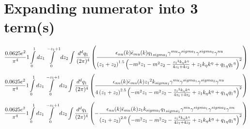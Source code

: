 \section*{Expanding numerator into 3 term(s)}
\begin{dmath}\frac{0.0625 e^{2}}{\pi^{4}}1\int\limits_{ 0 }^{ 1 } d{ z_{ 1 } }\int\limits_{ 0 }^{ - { z_{ 1 } } + 1 } d{ z_{ 2 } }\int\frac{d^d q_1 }{ (2\pi)^4 }\left(\frac{\epsilon_{ \\nu }({ k }) \bar{\epsilon}_{ \\mu }({ k }) { { q_1 }_{ \\sigma_1 } } { \gamma^{ \\mu } } { \gamma^{ \\sigma_1 } } { \gamma^{ \\sigma_2 } } { \gamma^{ \\nu } }}{\left({ z_{ 1 } } + { z_{ 2 } }\right)^{1.5} \left(- m^{2} { z_{ 1 } } - m^{2} { z_{ 2 } } - \frac{{ z_{ 1 } }^{2} { { k }_{ \eta } } { { k }^{ \eta } }}{4 { z_{ 1 } } + 4 { z_{ 2 } }} + { z_{ 1 } } { { k }_{ \eta } } { { k }^{ \eta } } + { { q_1 }_{ \eta } } { { q_1 }^{ \eta } }\right)^{2}}\right)\end{dmath}
\begin{dmath}\frac{0.0625 e^{2}}{\pi^{4}}1\int\limits_{ 0 }^{ 1 } d{ z_{ 1 } }\int\limits_{ 0 }^{ - { z_{ 1 } } + 1 } d{ z_{ 2 } }\int\frac{d^d q_1 }{ (2\pi)^4 }\left(\frac{\epsilon_{ \\nu }({ k }) \bar{\epsilon}_{ \\mu }({ k }) { z_{ 1 } }^{2} { { k }_{ \\sigma_1 } } { \gamma^{ \\mu } } { \gamma^{ \\sigma_1 } } { \gamma^{ \\sigma_2 } } { \gamma^{ \\nu } }}{4 \left({ z_{ 1 } } + { z_{ 2 } }\right)^{2.5} \left(- m^{2} { z_{ 1 } } - m^{2} { z_{ 2 } } - \frac{{ z_{ 1 } }^{2} { { k }_{ \eta } } { { k }^{ \eta } }}{4 { z_{ 1 } } + 4 { z_{ 2 } }} + { z_{ 1 } } { { k }_{ \eta } } { { k }^{ \eta } } + { { q_1 }_{ \eta } } { { q_1 }^{ \eta } }\right)^{2}}\right)\end{dmath}
\begin{dmath}\frac{0.0625 e^{2}}{\pi^{4}}1\int\limits_{ 0 }^{ 1 } d{ z_{ 1 } }\int\limits_{ 0 }^{ - { z_{ 1 } } + 1 } d{ z_{ 2 } }\int\frac{d^d q_1 }{ (2\pi)^4 }\left(- \frac{\epsilon_{ \\nu }({ k }) \bar{\epsilon}_{ \\mu }({ k }) { z_{ 1 } } { { k }_{ \\sigma_1 } } { { q_1 }_{ \\sigma_1 } } { \gamma^{ \\mu } } { \gamma^{ \\sigma_1 } } { \gamma^{ \\sigma_2 } } { \gamma^{ \\nu } }}{\left({ z_{ 1 } } + { z_{ 2 } }\right)^{2.0} \left(- m^{2} { z_{ 1 } } - m^{2} { z_{ 2 } } - \frac{{ z_{ 1 } }^{2} { { k }_{ \eta } } { { k }^{ \eta } }}{4 { z_{ 1 } } + 4 { z_{ 2 } }} + { z_{ 1 } } { { k }_{ \eta } } { { k }^{ \eta } } + { { q_1 }_{ \eta } } { { q_1 }^{ \eta } }\right)^{2}}\right)\end{dmath}
